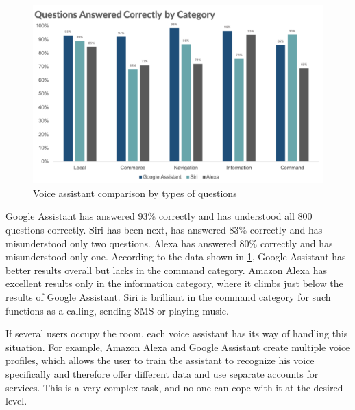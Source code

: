 \begin{figure}[H]
    \centering
    \includegraphics[width=\textwidth]{img/voice_assistant_comparison.png}
    \caption{Voice assistant comparison by types of questions}
    \label{fig:voice_assistant_comparison}
\end{figure}

Google Assistant has answered 93\% correctly and has understood all 800 questions correctly. Siri has been next, has answered 83\% correctly and has misunderstood only two questions. Alexa has answered 80\% correctly and has misunderstood only one. According to the data shown in \cref{fig:voice_assistant_comparison}, Google Assistant has better results overall but lacks in the command category. Amazon Alexa has excellent results only in the information category, where it climbs just below the results of Google Assistant. Siri is brilliant in the command category for such functions as a calling, sending SMS or playing music.

If several users occupy the room, each voice assistant has its way of handling this situation. For example, Amazon Alexa and Google Assistant create multiple voice profiles, which allows the user to train the assistant to recognize his voice specifically and therefore offer different data and use separate accounts for services. This is a very complex task, and no one can cope with it at the desired level.



